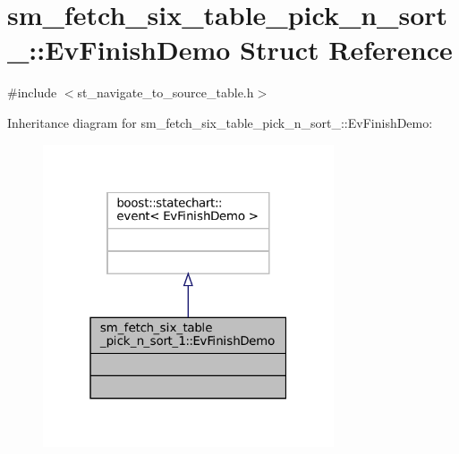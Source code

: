 \hypertarget{structsm__fetch__six__table__pick__n__sort__1_1_1EvFinishDemo}{}\section{sm\+\_\+fetch\+\_\+six\+\_\+table\+\_\+pick\+\_\+n\+\_\+sort\+\_\+:\+:Ev\+Finish\+Demo Struct Reference}
\label{structsm__fetch__six__table__pick__n__sort__1_1_1EvFinishDemo}


{\ttfamily \#include $<$st\+\_\+navigate\+\_\+to\+\_\+source\+\_\+table.\+h$>$}



Inheritance diagram for sm\+\_\+fetch\+\_\+six\+\_\+table\+\_\+pick\+\_\+n\+\_\+sort\+\_\+:\+:Ev\+Finish\+Demo\+:
\nopagebreak
\begin{figure}[H]
\begin{center}
\leavevmode
\includegraphics[width=244pt]{structsm__fetch__six__table__pick__n__sort__1_1_1EvFinishDemo__inherit__graph}
\end{center}
\end{figure}


